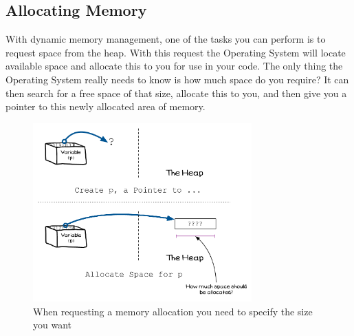 \clearpage
\subsection{Allocating Memory} %
\label{sub:allocating_memory}

With dynamic memory management, one of the tasks you can perform is to request space from the heap. With this request the Operating System will locate available space and allocate this to you for use in your code. The only thing the Operating System really needs to know is how much space do you require? It can then search for a free space of that size, allocate this to you, and then give you a pointer to this newly allocated area of memory.

\begin{figure}[h]
   \centering
   \includegraphics[width=0.75\textwidth]{./topics/dynamic-memory/diagrams/AllocateMemory-Overview} 
   \caption{When requesting a memory allocation you need to specify the size you want}
   \label{fig:allocate-memory-overview}
\end{figure}



